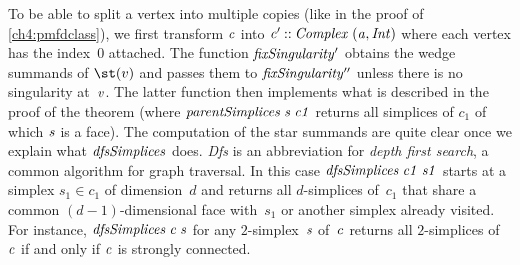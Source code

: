 \resethooks
To be able to split a vertex into multiple copies (like in the proof of
\cref{ch4:pmfdclass}), we first transform \ensuremath{\Varid{c}} into \ensuremath{\Varid{c'}\mathbin{::}\Conid{Complex}\;(\Varid{a},\Conid{Int})}
where each vertex has the index~$0$ attached. The function \ensuremath{\Varid{fixSingularity'}}
obtains the wedge summands of $\st(v)$ and passes them to \ensuremath{\Varid{fixSingularity''}}
unless there is no singularity at~\ensuremath{\Varid{v}}. The latter function then implements
what is described in the proof of the theorem (where \ensuremath{\Varid{parentSimplices}\;\Varid{s}\;\Varid{c1}}
returns all simplices of $c_1$ of which \ensuremath{\Varid{s}} is a face).
The computation of the star summands are quite clear once we explain what
\ensuremath{\Varid{dfsSimplices}} does. \emph{Dfs} is an abbreviation for \emph{depth first
search}, a common algorithm for graph traversal. In this case
\ensuremath{\Varid{dfsSimplices}\;\Varid{c1}\;\Varid{s1}} starts at a simplex $s_1\in c_1$ of dimension~$d$ and
returns all $d$-simplices of~$c_1$ that share a common $(d{-}1)$-dimensional face
with~$s_1$ or another simplex already visited. For instance, \ensuremath{\Varid{dfsSimplices}\;\Varid{c}\;\Varid{s}}
for any $2$-simplex~\ensuremath{\Varid{s}} of~\ensuremath{\Varid{c}} returns all $2$-simplices of~\ensuremath{\Varid{c}} if and only if
\ensuremath{\Varid{c}} is strongly connected.

